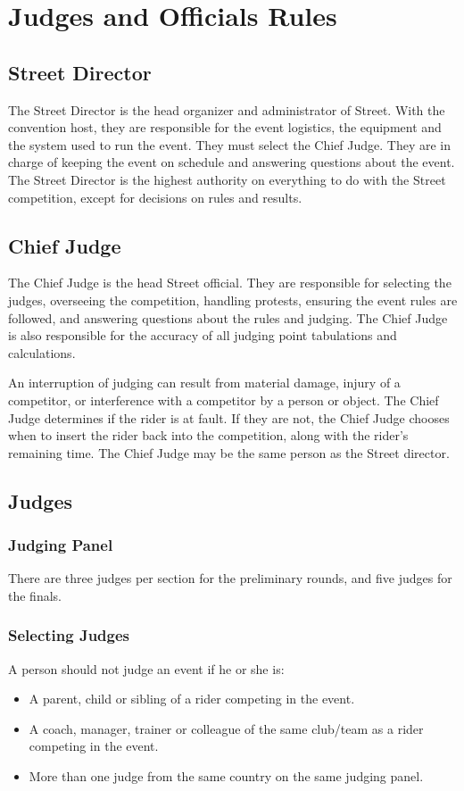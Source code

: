 \chapter{Judges and Officials Rules}

\section{Street Director}

The Street Director is the head organizer and administrator of Street.
With the convention host, they are responsible for the event logistics, the equipment and the system used to run the event.
They must select the Chief Judge.
They are in charge of keeping the event on schedule and answering questions about the event.
The Street Director is the highest authority on everything to do with the Street competition, except for decisions on rules and results.

\section{Chief Judge}

The Chief Judge is the head Street official.
They are responsible for selecting the judges, overseeing the competition, handling protests, ensuring the event rules are followed, and answering questions about the rules and judging.
The Chief Judge is also responsible for the accuracy of all judging point tabulations and calculations.

An interruption of judging can result from material damage, injury of a competitor, or interference with a competitor by a person or object.
The Chief Judge determines if the rider is at fault.
If they are not, the Chief Judge chooses when to insert the rider back into the competition, along with the rider's remaining time.
The Chief Judge may be the same person as the Street director.

\section{Judges}

\subsection{Judging Panel}

There are three judges per section for the preliminary rounds, and five judges for the finals.

\subsection{Selecting Judges}
A person should not judge an event if he or she is:
\begin{itemize}
\item A parent, child or sibling of a rider competing in the event.
\item A coach, manager, trainer or colleague of the same club/team as a rider competing in the event.
\item More than one judge from the same country on the same judging panel.
\end{itemize}


